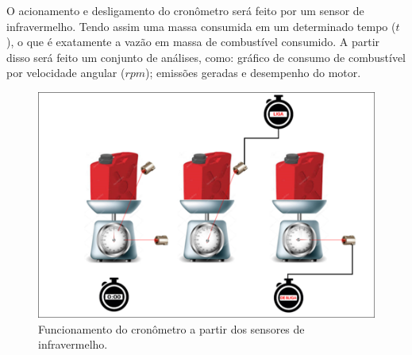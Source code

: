  O acionamento e desligamento do cronômetro será feito por um sensor de infravermelho. Tendo assim uma massa consumida em um determinado tempo ($t$), o que é exatamente a vazão em massa de combustível consumido. A partir disso será feito um conjunto de análises, como: gráfico de consumo de combustível por velocidade angular ($rpm$); emissões geradas e desempenho do motor.

\begin{figure}[h!]
	\centering
	\includegraphics[keepaspectratio=true,scale= 0.6]{figuras/funcionamento-cronometro.png}
	\caption{Funcionamento do cronômetro a partir dos sensores de infravermelho.}
	\label{funcionamento-cronometro}
\end{figure}
